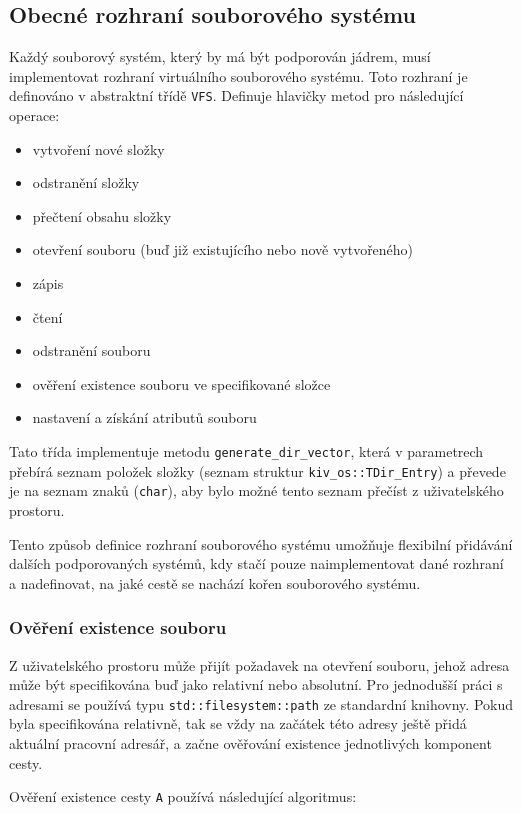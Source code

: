 \documentclass[12pt, a4paper]{article}
\begin{document}
\subsection{Obecné rozhraní souborového systému}
Každý souborový systém, který by má být podporován jádrem, musí implementovat rozhraní virtuálního souborového systému. Toto rozhraní je definováno v abstraktní třídě \texttt{VFS}. Definuje hlavičky metod pro následující operace:
\begin{itemize}
    \item vytvoření nové složky
    \item odstranění složky
    \item přečtení obsahu složky
    \item otevření souboru (buď již existujícího nebo nově vytvořeného)
    \item zápis
    \item čtení
    \item odstranění souboru
    \item ověření existence souboru ve specifikované složce 
    \item nastavení a získání atributů souboru 
\end{itemize}

Tato třída implementuje metodu \texttt{generate\_dir\_vector}, která v parametrech přebírá seznam položek složky (seznam struktur \texttt{kiv\_os::TDir\_Entry}) a převede je na seznam znaků (\texttt{char}), aby bylo možné tento seznam přečíst z uživatelského prostoru.

Tento způsob definice rozhraní souborového systému umožňuje flexibilní přidávání dalších podporovaných systémů, kdy stačí pouze naimplementovat dané rozhraní a nadefinovat, na jaké cestě se nachází kořen souborového systému. 

\subsubsection{Ověření existence souboru}
Z uživatelského prostoru může přijít požadavek na otevření souboru, jehož adresa může být specifikována buď jako relativní nebo absolutní. Pro jednodušší práci s adresami se používá typu \texttt{std::filesystem::path} ze standardní knihovny. Pokud byla specifikována relativně, tak se vždy na začátek této adresy ještě přidá aktuální pracovní adresář, a začne ověřování existence jednotlivých komponent cesty.

\noindent Ověření existence cesty \texttt{A} používá následující algoritmus:
\end{document}
